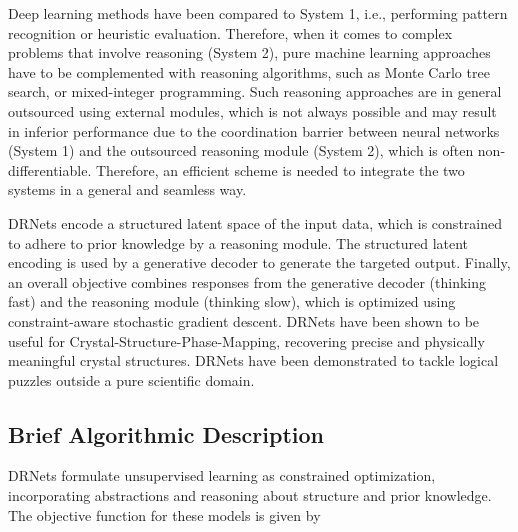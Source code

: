 \documentclass[book.tex]{subfiles}
\begin{document}
Deep learning methods have been compared to System 1, i.e., performing pattern recognition or heuristic evaluation. Therefore, when it comes to complex problems that involve reasoning (System 2), pure machine learning approaches have to be complemented with reasoning algorithms, such as Monte Carlo tree search, or mixed-integer programming. Such reasoning approaches are in general outsourced using external modules, which is not always possible and may result in inferior performance due to the coordination barrier between neural networks (System 1) and the outsourced reasoning module (System 2), which is often non-differentiable. Therefore, an efficient scheme is needed to integrate the two systems in a general and seamless way.

DRNets encode a structured latent space of the input data, which is constrained to adhere to prior
knowledge by a reasoning module. The structured latent encoding is used by a generative decoder to generate the targeted output. Finally, an overall objective combines responses from the generative decoder (thinking fast) and the reasoning module (thinking slow), which is optimized using constraint-aware stochastic gradient descent. DRNets have been shown to be useful for Crystal-Structure-Phase-Mapping, recovering precise and physically meaningful crystal structures. DRNets have been demonstrated to tackle logical puzzles outside a pure scientific domain.

\subsection{Brief Algorithmic Description}
DRNets formulate unsupervised learning as constrained optimization, incorporating abstractions and reasoning about structure and prior knowledge. The objective function for these models is given by
\end{document}

